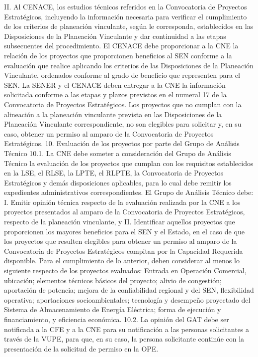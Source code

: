 II. Al CENACE, los estudios técnicos referidos en la Convocatoria de Proyectos Estratégicos, incluyendo la información necesaria para verificar el cumplimiento de los criterios de planeación vinculante, según le corresponda, establecidos en las Disposiciones de la Planeación Vinculante y dar continuidad a las etapas subsecuentes del procedimiento. El CENACE debe proporcionar a la CNE la relación de los proyectos que proporcionen beneficios al SEN conforme a la evaluación que realice aplicando los criterios de las Disposiciones de la Planeación Vinculante, ordenados conforme al grado de beneficio que representen para el SEN.
La SENER y el CENACE deben entregar a la CNE la información solicitada conforme a las etapas y plazos previstos en el numeral 17 de la Convocatoria de Proyectos Estratégicos.
Los proyectos que no cumplan con la alineación a la planeación vinculante prevista en las Disposiciones de la Planeación Vinculante correspondiente, no son elegibles para solicitar y, en su caso, obtener un permiso al amparo de la Convocatoria de Proyectos Estratégicos.
10. Evaluación de los proyectos por parte del Grupo de Análisis Técnico
10.1. La CNE debe someter a consideración del Grupo de Análisis Técnico la evaluación de los proyectos que cumplan con los requisitos establecidos en la LSE, el RLSE, la LPTE, el RLPTE, la Convocatoria de Proyectos Estratégicos y demás disposiciones aplicables, para lo cual debe remitir los expedientes administrativos correspondientes.
El Grupo de Análisis Técnico debe:
I. Emitir opinión técnica respecto de la evaluación realizada por la CNE a los proyectos presentados al amparo de la Convocatoria de Proyectos Estratégicos, respecto de la planeación vinculante, y
II. Identificar aquellos proyectos que proporcionen los mayores beneficios para el SEN y el Estado, en el caso de que los proyectos que resulten elegibles para obtener un permiso al amparo de la Convocatoria de Proyectos Estratégicos compitan por la Capacidad Requerida disponible. Para el cumplimiento de lo anterior, deben considerar al menos lo siguiente respecto de los proyectos evaluados: Entrada en Operación Comercial, ubicación; elementos técnicos básicos del proyecto; alivio de congestión; aportación de potencia; mejora de la confiabilidad regional y del SEN, flexibilidad operativa; aportaciones socioambientales; tecnología y desempeño proyectado del Sistema de Almacenamiento de Energía Eléctrica; forma de ejecución y financiamiento, y eficiencia económica.
10.2. La opinión del GAT debe ser notificada a la CFE y a la CNE para su notificación a las personas solicitantes a través de la VUPE, para que, en su caso, la persona solicitante continúe con la presentación de la solicitud de permiso en la OPE.
